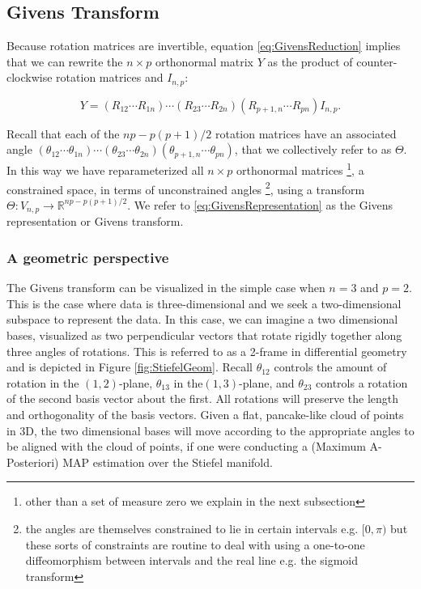 \documentclass{article}
\begin{document}
\subsection{Givens Transform}
Because rotation matrices are invertible, equation \ref{eq:GivensReduction} implies that we can rewrite the $n \times p$ orthonormal matrix $Y$ as the product of counter-clockwise rotation matrices and $I_{n,p}$:

\begin{equation}
\label{eq:GivensRepresentation}
Y = (R_{12} \cdots R_{1n}) \cdots (R_{23} \cdots R_{2n}) (R_{p+1,n} \cdots R_{pn}) I_{n,p}.
\end{equation}

Recall that each of the $np -p(p+1)/2$ rotation matrices have an associated  angle $(\theta_{12} \cdots \theta_{1n}) \cdots (\theta_{23} \cdots \theta_{2n}) (\theta_{p+1,n} \cdots \theta_{pn})$, that we collectively refer to as $\Theta$. In this way we have reparameterized all $n \times p$ orthonormal matrices \footnote{other than a set of measure zero we explain in the next subsection}, a constrained space, in terms of unconstrained angles \footnote{the angles are themselves constrained to lie in certain intervals e.g. $[0, \pi)$ but these sorts of constraints are routine to deal with using a one-to-one diffeomorphism between intervals and the real line e.g. the sigmoid transform}, using a transform $\Theta: V_{n,p} \to \mathbb{R}^{np -p(p+1)/2}$. We refer to \ref{eq:GivensRepresentation} as the Givens representation or Givens transform.

\subsubsection{A geometric perspective}
The Givens transform can be visualized in the simple case when $n = 3$ and $p = 2$. This is the case where data is three-dimensional and we seek a two-dimensional subspace to represent the data. In this case, we can imagine a two dimensional bases, visualized as two perpendicular vectors that rotate rigidly together along three angles of rotations. This is referred to as a 2-frame in differential geometry \citep{muirhead2009aspects} and is depicted in Figure \ref{fig:StiefelGeom}. Recall $\theta_{12}$ controls the amount of rotation in the $(1,2)$-plane, $\theta_{13}$ in the$(1,3)$-plane, and $\theta_{23}$ controls a rotation of the second basis vector about the first. All rotations will preserve the length and orthogonality of the basis vectors. Given a flat, pancake-like cloud of points in 3D, the two dimensional bases will move according to the appropriate angles to be aligned with the cloud of points, if one were conducting a (Maximum A-Posteriori) MAP estimation over the Stiefel manifold.
\end{document}
